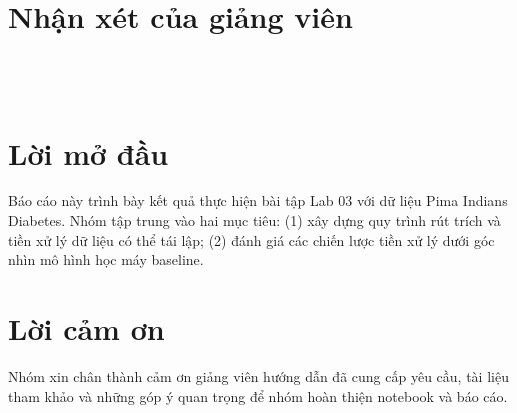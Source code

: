 \documentclass[12pt,a4paper]{report}
\begin{document}
\chapter*{Nhận xét của giảng viên}
\vspace{6cm}
\noindent\hrulefill\\[1.2cm]
\noindent\hrulefill\\[1.2cm]
\noindent\hrulefill

\chapter*{Lời mở đầu}
Báo cáo này trình bày kết quả thực hiện bài tập Lab 03 với dữ liệu Pima Indians Diabetes.
Nhóm tập trung vào hai mục tiêu: (1) xây dựng quy trình rút trích và tiền xử lý dữ liệu có thể tái lập;
(2) đánh giá các chiến lược tiền xử lý dưới góc nhìn mô hình học máy baseline.

\chapter*{Lời cảm ơn}
Nhóm xin chân thành cảm ơn giảng viên hướng dẫn đã cung cấp yêu cầu, tài liệu tham khảo
và những góp ý quan trọng để nhóm hoàn thiện notebook và báo cáo.

\tableofcontents
\listoffigures
\listoftables
\clearpage









\end{document}
